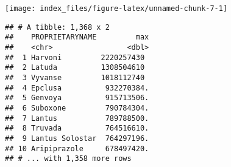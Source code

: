 \documentclass[
]{article}
\newenvironment{Shaded}{\begin{snugshade}}{\end{snugshade}}
\newcommand{\DataTypeTok}[1]{\textcolor[rgb]{0.13,0.29,0.53}{#1}}
\newcommand{\DecValTok}[1]{\textcolor[rgb]{0.00,0.00,0.81}{#1}}
\newcommand{\FloatTok}[1]{\textcolor[rgb]{0.00,0.00,0.81}{#1}}
\newcommand{\KeywordTok}[1]{\textcolor[rgb]{0.13,0.29,0.53}{\textbf{#1}}}
\newcommand{\NormalTok}[1]{#1}
\newcommand{\OperatorTok}[1]{\textcolor[rgb]{0.81,0.36,0.00}{\textbf{#1}}}
\newcommand{\StringTok}[1]{\textcolor[rgb]{0.31,0.60,0.02}{#1}}
\begin{document}
\begin{Shaded}
\end{Shaded}

\begin{center}\texttt{[image: index\_files/figure-latex/unnamed-chunk-7-1]} \end{center}

\begin{Shaded}
\end{Shaded}

\begin{verbatim}
## # A tibble: 1,368 x 2
##    PROPRIETARYNAME         max
##    <chr>                 <dbl>
##  1 Harvoni         2220257430 
##  2 Latuda          1308504610 
##  3 Vyvanse         1018112740 
##  4 Epclusa          932270384.
##  5 Genvoya          915713506.
##  6 Suboxone         790784304.
##  7 Lantus           789788500.
##  8 Truvada          764516610.
##  9 Lantus Solostar  764297196.
## 10 Aripiprazole     678497420.
## # ... with 1,358 more rows
\end{verbatim}
\end{document}
